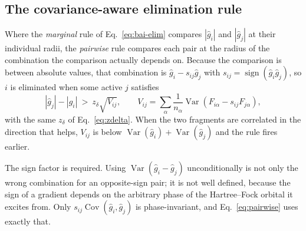 \documentclass[10pt]{article}
\newcommand{\Var}{\operatorname{Var}}
\newcommand{\Cov}{\operatorname{Cov}}
\begin{document}
\subsection{The covariance-aware elimination rule}

Where the \emph{marginal} rule of Eq.~\eqref{eq:bai-elim} compares
$|\widehat g_i|$ and $|\widehat g_j|$ at their individual radii, the
\emph{pairwise} rule compares each pair at the radius of the combination the
comparison actually depends on. Because the comparison is between absolute
values, that combination is $\widehat g_i-s_{ij}\widehat g_j$ with
$s_{ij}=\operatorname{sign}(\widehat g_i\widehat g_j)$, so $i$ is eliminated when
some active $j$ satisfies
\begin{equation}
  |\widehat g_j|-|\widehat g_i| \ > \ z_\delta\sqrt{V_{ij}},
  \qquad
  V_{ij}=\sum_\alpha\frac{1}{n_\alpha}
         \Var\!\left(F_{i\alpha}-s_{ij}F_{j\alpha}\right),
  \label{eq:pairwise}
\end{equation}
with the same $z_\delta$ of Eq.~\eqref{eq:zdelta}. When the two fragments are
correlated in the direction that helps, $V_{ij}$ is below
$\Var(\widehat g_i)+\Var(\widehat g_j)$ and the rule fires earlier.

The sign factor is required. Using $\Var(\widehat g_i-\widehat g_j)$
unconditionally is not only the wrong combination for an opposite-sign pair; it is
not well defined, because the sign of a gradient depends on the arbitrary phase of
the Hartree--Fock orbital it excites from. Only $s_{ij}\Cov(\widehat g_i,\widehat g_j)$
is phase-invariant, and Eq.~\eqref{eq:pairwise} uses exactly that.
\end{document}
